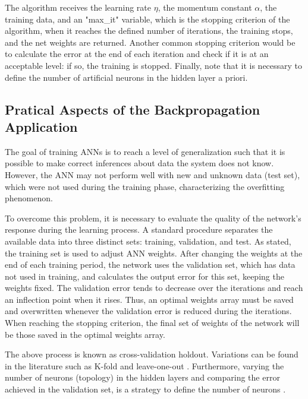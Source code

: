 \documentclass[ruled,graybox]{svmult}
\begin{document}

The algorithm receives the learning rate $\eta$, the momentum constant $\alpha$, the training data, and an "max\_it" variable, which is the stopping criterion of the algorithm, when it reaches the defined number of iterations, the training stops, and the net weights are returned. Another common stopping criterion would be to calculate the error at the end of each iteration and check if it is at an acceptable level: if so, the training is stopped. Finally, note that it is necessary to define the number of artificial neurons in the hidden layer a priori.

\subsection{Pratical Aspects of the Backpropagation Application}
\label{ssec:Pratical}

The goal of training ANNs is to reach a level of generalization such that it is possible to make correct inferences about data the system does not know. However, the ANN may not perform well with new and unknown data (test set), which were not used during the training phase, characterizing the overfitting phenomenon.

To overcome this problem, it is necessary to evaluate the quality of the network's response during the learning process. A standard procedure separates the available data into three distinct sets: training, validation, and test. As stated, the training set is used to adjust ANN weights. After changing the weights at the end of each training period, the network uses the validation set, which has data not used in training, and calculates the output error for this set, keeping the weights fixed. The validation error tends to decrease over the iterations and reach an inflection point when it rises. Thus, an optimal weights array must be saved and overwritten whenever the validation error is reduced during the iterations. When reaching the stopping criterion, the final set of weights of the network will be those saved in the optimal weights array. %

The above process is known as cross-validation holdout. Variations can be found in the literature such as K-fold and leave-one-out \cite{haykin, Castro2006FundamentalsON}.
Furthermore, varying the number of neurons (topology) in the hidden layers and comparing the error achieved in the validation set, is a strategy to define the number of neurons \cite{James2013}.
\end{document}
